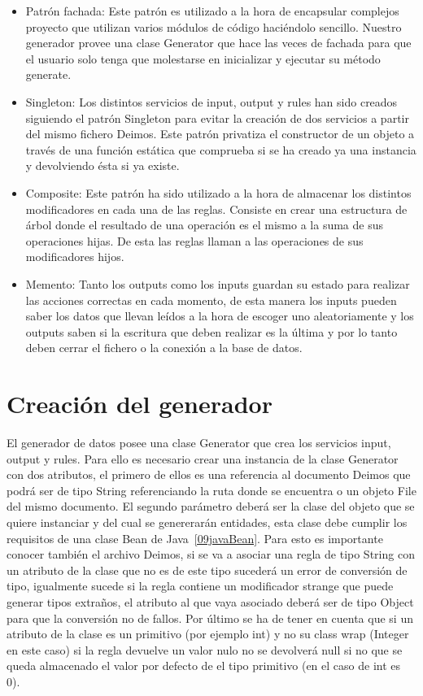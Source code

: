 \begin{itemize}
  \item Patrón fachada: Este patrón es utilizado a la hora de encapsular complejos proyecto que utilizan varios módulos de código haciéndolo sencillo. Nuestro generador provee una clase Generator que hace las veces de fachada para que el usuario solo tenga que molestarse en inicializar y ejecutar su método generate.
  \item Singleton: Los distintos servicios de input, output y rules han sido creados siguiendo el patrón Singleton para evitar la creación de dos servicios a partir del mismo fichero Deimos. Este patrón privatiza el constructor de un objeto a través de una función estática que comprueba si se ha creado ya una instancia y devolviendo ésta si ya existe.
  \item Composite: Este patrón ha sido utilizado a la hora de almacenar los distintos modificadores en cada una de las reglas. Consiste en crear una estructura de árbol donde el resultado de una operación es el mismo a la suma de sus operaciones hijas. De esta las reglas llaman a las operaciones de sus modificadores hijos.
  \item Memento: Tanto los outputs como los inputs guardan su estado para realizar las acciones correctas en cada momento, de esta manera los inputs pueden saber los datos que llevan leídos a la hora de escoger uno aleatoriamente y los outputs saben si la escritura que deben realizar es la última y por lo tanto deben cerrar el fichero o la conexión a la base de datos.
\end{itemize}



\section{Creación del generador}

El generador de datos posee una clase Generator que crea los servicios input, output y rules. Para ello es necesario crear una instancia de la clase Generator con dos atributos, el primero de ellos es una referencia al documento Deimos que podrá ser de tipo String referenciando la ruta donde se encuentra o un objeto File del mismo documento. El segundo parámetro deberá ser la clase del objeto que se quiere instanciar y del cual se genererarán entidades, esta clase debe cumplir los requisitos de una clase Bean de Java~\ref{09javaBean}. Para esto es importante conocer también el archivo Deimos, si se va a asociar una regla de tipo String con un atributo de la clase que no es de este tipo sucederá un error de conversión de tipo, igualmente sucede si la regla contiene un modificador strange que puede generar tipos extraños, el atributo al que vaya asociado deberá ser de tipo Object para que la conversión no de fallos. Por último se ha de tener en cuenta que si un atributo de la clase es un primitivo (por ejemplo int) y no su class wrap (Integer en este caso) si la regla devuelve un valor nulo no se devolverá null si no que se queda almacenado el valor por defecto de el tipo primitivo (en el caso de int es 0).

